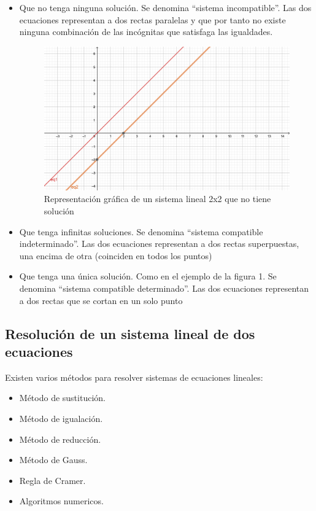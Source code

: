 \documentclass[a4paper, apacite, 12pt, doc]{apa6}
\begin{document}
\begin{itemize}
	\item  Que no tenga ninguna solución. Se denomina “sistema incompatible”. Las dos ecuaciones representan a dos rectas paralelas y que por tanto no existe ninguna combinación de las incógnitas que satisfaga las igualdades.

\begin{figure}[h]
	\centering
	\includegraphics[scale=0.75]{img02}
	\caption{Representación gráfica de un sistema lineal 2x2 que no tiene solución}
\end{figure}



\item Que tenga infinitas soluciones. Se denomina “sistema compatible indeterminado”. Las dos ecuaciones representan a dos rectas superpuestas, una encima de otra (coinciden en todos los puntos)




\item Que tenga una única solución. Como en el ejemplo de la figura 1. Se denomina “sistema compatible determinado”. Las dos ecuaciones representan a dos rectas que se cortan en un solo punto

\end{itemize}


\subsection{Resolución de un sistema lineal de dos ecuaciones}

Existen varios métodos para resolver sistemas de ecuaciones lineales:

\begin{itemize}
	\item Método de sustitución.
	\item Método de igualación.
	\item Método de reducción.
	\item Método de Gauss.
	\item Regla de Cramer.
	\item Algoritmos numericos.
\end{itemize}
\end{document}
